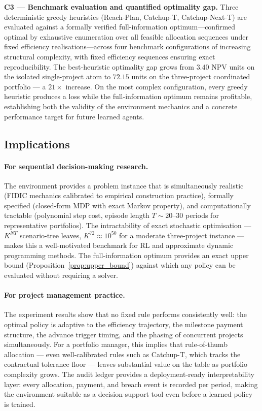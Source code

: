 \textbf{C3 --- Benchmark evaluation and quantified optimality gap.}
Three deterministic greedy heuristics (Reach-Plan, Catchup-T,
Catchup-Next-T) are evaluated against a formally verified
full-information optimum---confirmed optimal by exhaustive enumeration
over all feasible allocation sequences under fixed efficiency
realisations---across four benchmark configurations of
increasing structural complexity, with fixed efficiency sequences
ensuring exact reproducibility. The best-heuristic optimality gap
grows from $3.40$ NPV units on the isolated single-project atom to
$72.15$ units on the three-project coordinated portfolio --- a
$21\times$ increase. On the most complex configuration, every greedy
heuristic produces a loss while the full-information optimum remains
profitable, establishing both the validity of the environment
mechanics and a concrete performance target for future learned agents.

\subsection{Implications}
\label{subsec:implications}

\paragraph{For sequential decision-making research.}
The environment provides a problem instance that is simultaneously
realistic (FIDIC mechanics calibrated to empirical construction
practice), formally specified (closed-form MDP with exact Markov
property), and computationally tractable (polynomial step cost,
episode length $T \sim 20$--$30$ periods for representative
portfolios). The intractability of exact stochastic optimisation ---
$K^{NT}$ scenario-tree leaves, $K^{72} \approx 10^{50}$ for a
moderate three-project instance --- makes this a well-motivated
benchmark for RL and approximate dynamic programming methods. The
full-information optimum provides an exact upper bound
(Proposition~\ref{prop:upper_bound}) against which any policy can
be evaluated without requiring a solver.

\paragraph{For project management practice.}
The experiment results show that no fixed rule performs consistently
well: the optimal policy is adaptive to the efficiency trajectory,
the milestone payment structure, the advance trigger timing, and the
phasing of concurrent projects simultaneously. For a portfolio manager,
this implies that rule-of-thumb allocation --- even well-calibrated
rules such as Catchup-T, which tracks the contractual tolerance floor
--- leaves substantial value on the table as portfolio complexity
grows. The audit ledger provides a deployment-ready interpretability
layer: every allocation, payment, and breach event is recorded per
period, making the environment suitable as a decision-support tool
even before a learned policy is trained.

